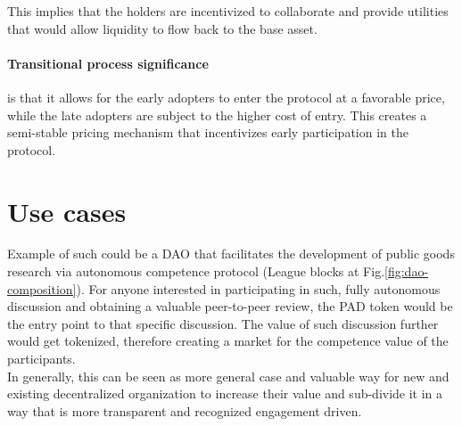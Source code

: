 \documentclass{article}
\begin{document}
\begin{CJK}{UTF8}{gbsn}
\begin{multicols}{2}
        This implies that the holders are incentivized to collaborate and provide utilities that would allow liquidity to flow back to the base asset.

        \paragraph{Transitional process significance} is that it allows for the early adopters to enter the protocol at a favorable price, while the late adopters are subject to the higher cost of entry. This creates a semi-stable pricing mechanism that incentivizes early participation in the protocol.

        \section{Use cases} Example of such could be a DAO that facilitates the development of public goods research via autonomous competence protocol (League blocks at Fig.\ref{fig:dao-composition}). For anyone interested in participating in such, fully autonomous discussion and obtaining a valuable peer-to-peer review, the PAD token would be the entry point to that specific discussion. The value of such discussion further would get tokenized, therefore creating a market for the competence value of the participants. \\

        In generally, this can be seen as more general case and valuable way for new and existing decentralized organization to increase their value and sub-divide it in a way that is more transparent and recognized engagement driven.









\end{multicols}
\end{CJK}
\end{document}
